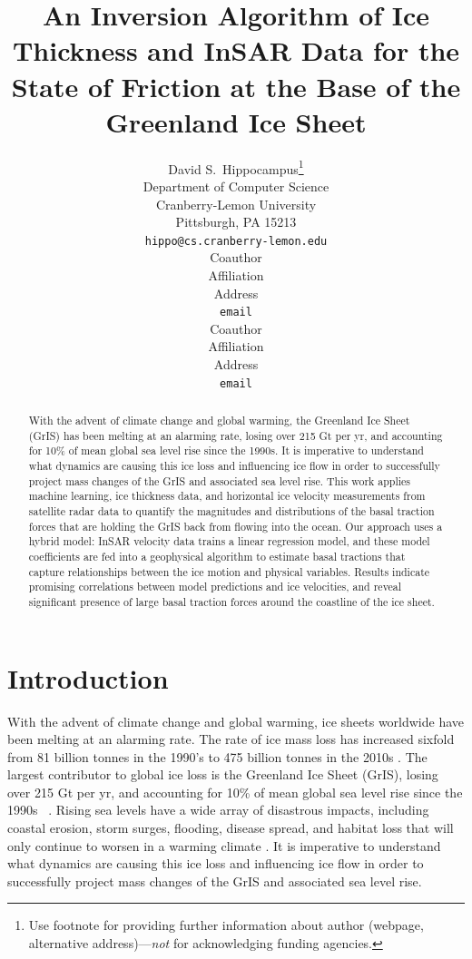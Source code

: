 \documentclass{article}
\title{An Inversion Algorithm of Ice Thickness and InSAR Data for
the State of Friction at the Base of the Greenland Ice Sheet}
\author{%
  David S.~Hippocampus\thanks{Use footnote for providing further information
    about author (webpage, alternative address)---\emph{not} for acknowledging
    funding agencies.} \\
  Department of Computer Science\\
  Cranberry-Lemon University\\
  Pittsburgh, PA 15213 \\
  \texttt{hippo@cs.cranberry-lemon.edu} \\
   \And
   Coauthor \\
   Affiliation \\
   Address \\
   \texttt{email} \\
   \AND
   Coauthor \\
   Affiliation \\
   Address \\
   \texttt{email} \\
}
\begin{document}
\maketitle

\begin{abstract}
With the advent of climate change and global warming, the Greenland Ice Sheet (GrIS) has been melting at an alarming rate, losing over 215 Gt per yr, and accounting for 10\% of mean global sea level rise since the 1990s. It is imperative to understand what dynamics are causing this ice loss and influencing ice flow in order to successfully project mass changes of the GrIS and associated sea level rise. This work applies machine learning, ice thickness data, and horizontal ice velocity measurements from satellite radar data to quantify the magnitudes and distributions of the basal traction forces that are holding the GrIS back from flowing into the ocean. Our approach uses a hybrid model: InSAR velocity data trains a linear regression model, and these model coefficients are fed into a geophysical algorithm to estimate basal tractions that capture relationships between the ice motion and physical variables. Results indicate promising correlations between model predictions and ice velocities, and reveal significant presence of large basal traction forces around the coastline of the ice sheet.


\end{abstract}

\section{Introduction}

With the advent of climate change and global warming, ice sheets worldwide have been melting at an alarming rate. The rate of ice mass loss has increased sixfold from 81 billion tonnes in the 1990’s to 475 billion tonnes in the 2010s \cite{the_imbie_team_mass_2020}. The largest contributor to global ice loss is the Greenland Ice Sheet (GrIS), losing over 215 Gt per yr, and accounting for 10\% of mean global sea level rise since the 1990s ~\cite{stocker_climate_2013}. Rising sea levels have a wide array of disastrous impacts, including coastal erosion, storm surges, flooding, disease spread, and habitat loss that will only continue to worsen in a warming climate \cite{pattyn_greenland_2018}. It is imperative to understand what dynamics are causing this ice loss and influencing ice flow in order to successfully project mass changes of the GrIS and associated sea level rise.
\end{document}
